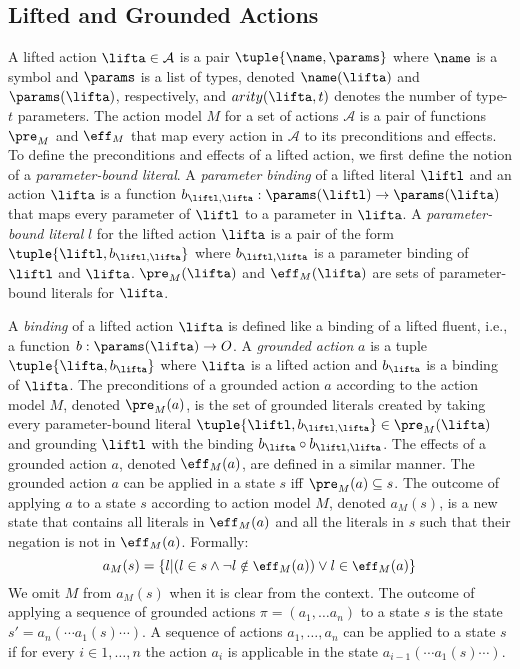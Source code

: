\subsection{Lifted and Grounded Actions}
A lifted action $\lifta\in \mathcal{A}$ is a pair $\tuple{\name, \params}$ 
where $\name$ is a symbol and $\params$ is a list of types, 
denoted $\name(\lifta)$ and $\params(\lifta)$, respectively, and $arity(\lifta,t)$ denotes the number of type-$t$ parameters. 
The action model $M$ for a set of actions $\mathcal{A}$ 
is a pair of functions $\pre_M$ and $\eff_M$ that map every action in $\mathcal{A}$ to its preconditions and effects. 
To define the preconditions and effects of a lifted action, 
we first define the notion of a \emph{parameter-bound literal}. 
A \emph{parameter binding} of a lifted literal $\liftl$ and an action $\lifta$ is a function $b_{\liftl,\lifta}: \params(\liftl)\rightarrow \params(\lifta)$ that maps every parameter of $\liftl$ to a parameter in $\lifta$. 
A \emph{parameter-bound literal} $l$ for the lifted action $\lifta$ is a 
pair of the form $\tuple{\liftl,b_{\liftl,\lifta}}$ where $b_{\liftl,\lifta}$ is a parameter binding of $\liftl$ and $\lifta$. 
$\pre_M(\lifta)$ and $\eff_M(\lifta)$ are sets of parameter-bound literals for $\lifta$. 




A \emph{binding} of a lifted action $\lifta$ is defined like a binding of a lifted fluent, i.e., a function $b:\params(\lifta)\rightarrow O$. 
A \emph{grounded action} $a$ is a tuple $\tuple{\lifta, b_\lifta}$ where $\lifta$ is a lifted action and $b_\lifta$ is a binding of $\lifta$. 
The preconditions of a grounded action $a$ according to the action model $M$, denoted $\pre_M(a)$, is the set of grounded literals created by taking every parameter-bound literal $\tuple{\liftl, b_{\liftl,\lifta}}\in \pre_M(\lifta)$ and grounding $\liftl$ with the binding $b_\lifta\circ b_{\liftl,\lifta}$. 
The effects of a grounded action $a$, denoted $\eff_M(a)$, are defined in a similar manner. 
The grounded action $a$ can be applied in a state $s$ iff $\pre_M(a)\subseteq s$. 
The outcome of applying $a$ to a state $s$ according to action model $M$, denoted $a_M(s)$, is a new state that contains all literals in $\eff_M(a)$ and all the literals in $s$ such that their negation is not in $\eff_M(a)$. 
Formally:
\begin{equation}\small
    a_M(s)=\{ l | (l\in s \wedge \neg l\notin \eff_M(a)) \vee l\in \eff_M(a) \} 
\end{equation}
We omit $M$ from $a_M(s)$ when it is clear from the context.
The outcome of applying a sequence of grounded actions $\pi=(a_1,\ldots a_n)$ to a state $s$ is the state $s'=a_n(\cdots a_1(s)\cdots)$. 
A sequence of actions $a_1,\ldots, a_n$ can be applied to a state $s$ 
if for every $i\in 1,\ldots,n$ the action $a_i$ is applicable in the state 
$a_{i-1}(\cdots a_1(s)\cdots)$. 

